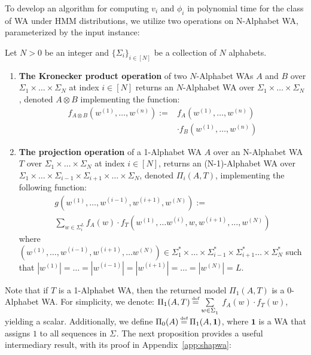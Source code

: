 To develop an algorithm for computing $v_i$ and $\phi_i$ in polynomial time for the class of WA under HMM distributions, we utilize two operations on N-Alphabet WA, parameterized by the input instance:

\begin{definition} \label{def:projectionoperation}
  Let $N > 0$ be an integer and $\{\Sigma_{i}\}_{i \in [N]}$ be a collection of $N$ alphabets.
  \begin{enumerate}  
  \item \textbf{The Kronecker product operation} of two $N$-Alphabet WAs $A$ and $B$ over $\Sigma_{1} \times \ldots \times \Sigma_{N}$ at index $i \in [N]$ returns an $N$-Alphabet WA over $\Sigma_{1} \times \ldots \times \Sigma_{N}$, denoted $A \otimes B$ 
  implementing the function:
  \begin{align*} 
  f_{A \otimes B}(w^{(1)},\ldots, w^{(n)}) :=& f_{A}(w^{(1)},\ldots, w^{(n)}) \\
  & \cdot f_{B}(w^{(1)},\ldots, w^{(n)})
  \end{align*}
  \item \textbf{The projection operation} of a 1-Alphabet WA $A$ over an N-Alphabet WA $T$ over $\Sigma_{1} \times \ldots \times \Sigma_{N}$ at index $i \in [N]$, returns an (N-1)-Alphabet WA over $\Sigma_{1} \times \ldots \times \Sigma_{i-1} \times \Sigma_{i+1} \times \ldots \times \Sigma_{N}$, denoted $\Pi_{i}(A,T)$, implementing the following function:
       \begin{align*}
           g(w^{(1)}, \ldots, w^{(i-1)}, w^{(i+1)}, w^{(N)}) := ~~~~~~~~~~~~  \\ 
           \sum\limits_{w \in \Sigma_{i}^{L}} f_{A}(w) \cdot f_{T}(w^{(1)}, \ldots w^{(i)}, w, w^{(i+1)}, \ldots, w^{(N)})
        \end{align*}
       where $(w^{(1)}, \ldots, w^{(i-1)}, w^{(i+1)}, \ldots w^{(N)}) \in \Sigma_{1}^{*} \times \ldots \times \Sigma_{i-1}^{*} \times \Sigma_{i+1}^{*} \ldots \times \Sigma_{N}^{*}$ such that $|w^{(1)}| = \ldots =|w^{(i-1)}| = |w^{(i+1)}| = \ldots = |w^{(N)}| = L$.
       \end{enumerate}
\end{definition}

Note that if $T$ is a 1-Alphabet WA, then the returned model $\Pi_{1}(A,T)$ is a 0-Alphabet WA. For simplicity, we denote: $\Pi_{1}(A,T) \myeq \sum\limits_{w \in \Sigma_{1}^{}}$ $f_{A}(w) \cdot f_{T}(w)$, yielding a scalar. Additionally, we define $\Pi_{0}(A) \myeq \Pi_{1}(A,\mathbf{1})$, where $\mathbf{1}$ is a WA that assigns $1$ to all sequences in $\Sigma^{}$. The next proposition provides a useful intermediary result, with its proof in Appendix~\ref{app:shapwa}:

